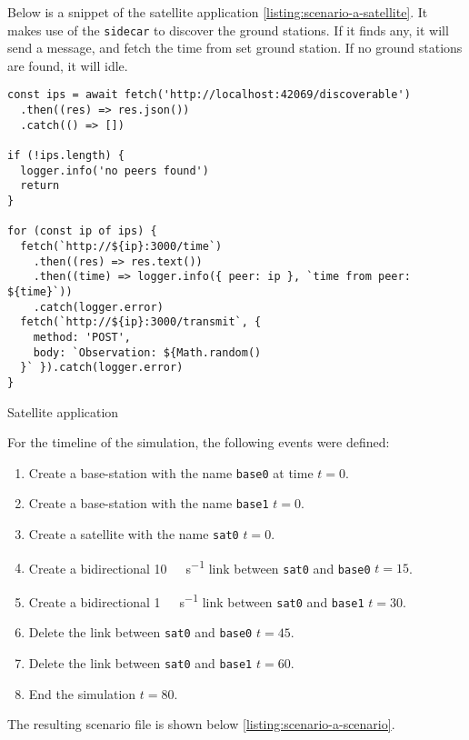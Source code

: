 Below is a snippet of the satellite application \ref{listing:scenario-a-satellite}. It makes use of the \verb|sidecar| to discover the ground stations. If it finds any, it will send a message, and fetch the time from set ground station. If no ground stations are found, it will idle.

\begin{listing}[H]
  \begin{verbatim}
const ips = await fetch('http://localhost:42069/discoverable')
  .then((res) => res.json())
  .catch(() => [])

if (!ips.length) {
  logger.info('no peers found')
  return
}

for (const ip of ips) {
  fetch(`http://${ip}:3000/time`)
    .then((res) => res.text())
    .then((time) => logger.info({ peer: ip }, `time from peer: ${time}`))
    .catch(logger.error)
  fetch(`http://${ip}:3000/transmit`, {
    method: 'POST',
    body: `Observation: ${Math.random()
  }` }).catch(logger.error)
}
\end{verbatim}
  \caption{Satellite application}
  \label{listing:scenario-a-satellite}
\end{listing}

For the timeline of the simulation, the following events were defined:

\begin{enumerate}
  \item Create a base-station with the name \verb|base0| at time $t=0$.
  \item Create a base-station with the name \verb|base1| $t=0$.
  \item Create a satellite with the name \verb|sat0| $t=0$.
  \item Create a bidirectional \SI{10}{\mebi\byte\per\second} link between \verb|sat0| and \verb|base0| $t=15$.
  \item Create a bidirectional \SI{1}{\mebi\byte\per\second} link between \verb|sat0| and \verb|base1| $t=30$.
  \item Delete the link between \verb|sat0| and \verb|base0| $t=45$.
  \item Delete the link between \verb|sat0| and \verb|base1| $t=60$.
  \item End the simulation $t=80$.
\end{enumerate}

The resulting scenario file is shown below \ref{listing:scenario-a-scenario}.

